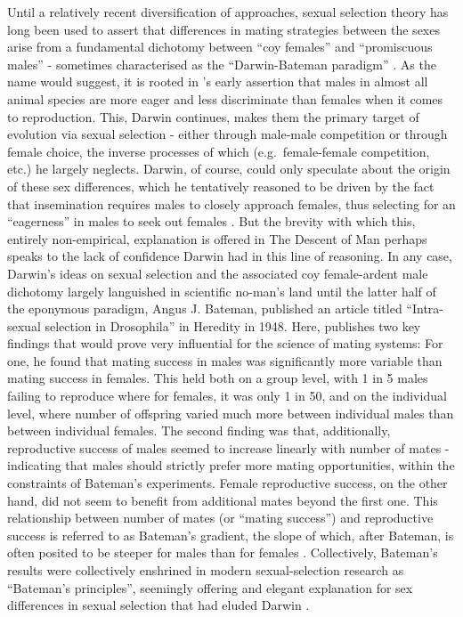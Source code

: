 \documentclass[
]{article}
\begin{document}
Until a relatively recent diversification of approaches, sexual
selection theory has long been used to assert that differences in mating
strategies between the sexes arise from a fundamental dichotomy between
``coy females'' and ``promiscuous males'' - sometimes characterised as
the ``Darwin-Bateman paradigm'' \citep{borgerhoffmulder2021}. As the
name would suggest, it is rooted in \citet{darwin1981} 's early
assertion that males in almost all animal species are more eager and
less discriminate than females when it comes to reproduction. This,
Darwin continues, makes them the primary target of evolution via sexual
selection - either through male-male competition or through female
choice, the inverse processes of which (e.g.~female-female competition,
etc.) he largely neglects. Darwin, of course, could only speculate about
the origin of these sex differences, which he tentatively reasoned to be
driven by the fact that insemination requires males to closely approach
females, thus selecting for an ``eagerness'' in males to seek out
females \citep{darwin1981}. But the brevity with which this, entirely
non-empirical, explanation is offered in The Descent of Man perhaps
speaks to the lack of confidence Darwin had in this line of reasoning.
In any case, Darwin's ideas on sexual selection and the associated coy
female-ardent male dichotomy largely languished in scientific no-man's
land until the latter half of the eponymous paradigm, Angus J. Bateman,
published an article titled ``Intra-sexual selection in Drosophila'' in
Heredity in 1948. Here, \citet{bateman1948} publishes two key findings
that would prove very influential for the science of mating systems: For
one, he found that mating success in males was significantly more
variable than mating success in females. This held both on a group
level, with 1 in 5 males failing to reproduce where for females, it was
only 1 in 50, and on the individual level, where number of offspring
varied much more between individual males than between individual
females. The second finding was that, additionally, reproductive success
of males seemed to increase linearly with number of mates - indicating
that males should strictly prefer more mating opportunities, within the
constraints of Bateman's experiments. Female reproductive success, on
the other hand, did not seem to benefit from additional mates beyond the
first one. This relationship between number of mates (or ``mating
success'') and reproductive success is referred to as Bateman's
gradient, the slope of which, after Bateman, is often posited to be
steeper for males than for females \citep{gerlach2012}. Collectively,
Bateman's results were collectively enshrined in modern sexual-selection
research as ``Bateman's principles'', seemingly offering and elegant
explanation for sex differences in sexual selection that had eluded
Darwin \citep{arnold1994}.
\end{document}
